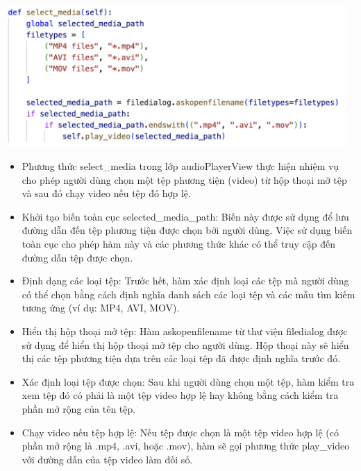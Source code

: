 \documentclass[a4paper]{article}
\begin{document}
\begin{center}
\includegraphics[width=130mm]{template_SGU 2/audio_select_media.png}
\end{center}
\begin{itemize}
    \item Phương thức select\_media trong lớp audioPlayerView thực hiện nhiệm vụ cho phép người dùng chọn một tệp phương tiện (video) từ hộp thoại mở tệp và sau đó chạy video nếu tệp đó hợp lệ.
    \item Khởi tạo biến toàn cục selected\_media\_path: Biến này được sử dụng để lưu đường dẫn đến tệp phương tiện được chọn bởi người dùng. Việc sử dụng biến toàn cục cho phép hàm này và các phương thức khác có thể truy cập đến đường dẫn tệp được chọn.
    \item Định dạng các loại tệp: Trước hết, hàm xác định loại các tệp mà người dùng có thể chọn bằng cách định nghĩa danh sách các loại tệp và các mẫu tìm kiếm tương ứng (ví dụ: MP4, AVI, MOV).
    \item Hiển thị hộp thoại mở tệp: Hàm askopenfilename từ thư viện filedialog được sử dụng để hiển thị hộp thoại mở tệp cho người dùng. Hộp thoại này sẽ hiển thị các tệp phương tiện dựa trên các loại tệp đã được định nghĩa trước đó.
    \item Xác định loại tệp được chọn: Sau khi người dùng chọn một tệp, hàm kiểm tra xem tệp đó có phải là một tệp video hợp lệ hay không bằng cách kiểm tra phần mở rộng của tên tệp.
    \item Chạy video nếu tệp hợp lệ: Nếu tệp được chọn là một tệp video hợp lệ (có phần mở rộng là .mp4, .avi, hoặc .mov), hàm sẽ gọi phương thức play\_video với đường dẫn của tệp video làm đối số.
    
\end{itemize}
\end{document}
